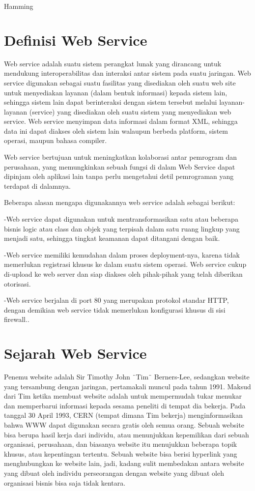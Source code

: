 {Hamming}

\section{Definisi Web Service}
Web service adalah suatu sistem perangkat lunak yang dirancang untuk mendukung interoperabilitas dan interaksi antar sistem pada suatu jaringan. Web service digunakan sebagai suatu fasilitas yang disediakan oleh suatu web site untuk menyediakan layanan (dalam bentuk informasi) kepada sistem lain, sehingga sistem lain dapat berinteraksi dengan sistem tersebut melalui layanan-layanan (service) yang disediakan oleh suatu sistem yang menyediakan web service. Web service menyimpan data informasi dalam format XML, sehingga data ini dapat diakses oleh sistem lain walaupun berbeda platform, sistem operasi, maupun bahasa compiler.

Web service bertujuan untuk meningkatkan kolaborasi antar pemrogram dan perusahaan, yang memungkinkan sebuah fungsi di dalam Web Service dapat dipinjam oleh aplikasi lain tanpa perlu mengetahui detil pemrograman yang terdapat di dalamnya.

Beberapa alasan mengapa digunakannya web service  adalah sebagai berikut:

-Web service dapat digunakan untuk mentransformasikan satu atau beberapa bisnis logic atau class dan objek yang terpisah dalam satu ruang lingkup yang menjadi satu, sehingga tingkat keamanan dapat ditangani dengan baik. 

-Web service memiliki kemudahan dalam proses deployment-nya, karena tidak memerlukan registrasi khusus ke dalam suatu sistem operasi. Web service cukup di-upload ke web server dan siap diakses oleh pihak-pihak yang telah diberikan otorisasi.

-Web service berjalan di port  80 yang merupakan protokol standar HTTP, dengan demikian web service tidak memerlukan konfigurasi khusus di sisi firewall.\cite{awangga2017colenak}.

\section{Sejarah Web Service}
Penemu website adalah Sir Timothy John ¨Tim¨ Berners-Lee, sedangkan website yang tersambung dengan jaringan, pertamakali muncul pada tahun 1991. Maksud dari Tim ketika membuat website adalah untuk mempermudah tukar menukar dan memperbarui informasi kepada sesama peneliti di tempat dia bekerja. Pada tanggal 30 April 1993, CERN (tempat dimana Tim bekerja) menginformasikan bahwa WWW dapat digunakan secara gratis oleh semua orang. Sebuah website bisa berupa hasil kerja dari individu, atau menunjukkan kepemilikan dari sebuah organisasi, perusahaan, dan biasanya website itu menujukkan beberapa topik khusus, atau kepentingan tertentu. Sebuah website bisa berisi hyperlink yang menghubungkan ke website lain, jadi, kadang sulit membedakan antara website yang dibuat oleh individu perseorangan dengan website yang dibuat oleh organisasi bisnis bisa saja tidak kentara.

